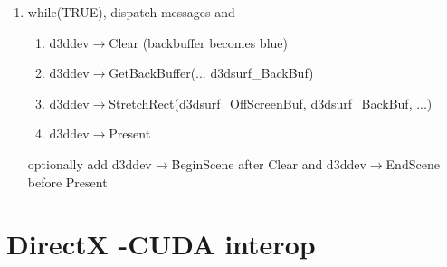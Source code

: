 \begin{frame}
\begin{enumerate}
		\item while(TRUE), dispatch messages and 
			\begin{enumerate}\tiny
				\item {\color{red}d3ddev}$\rightarrow$Clear (backbuffer becomes blue)
				\item {\color{red}d3ddev}$\rightarrow$GetBackBuffer(... {\color{red}d3dsurf\_BackBuf})
				\item {\color{red}d3ddev}$\rightarrow$StretchRect({\color{red}d3dsurf\_OffScreenBuf}, {\color{red}d3dsurf\_BackBuf}, ...)
				\item {\color{red}d3ddev}$\rightarrow$Present
			\end{enumerate}
			optionally add {\color{red}d3ddev}$\rightarrow$BeginScene after Clear and  {\color{red}d3ddev}$\rightarrow$EndScene before Present
	\end{enumerate}
\end{frame}






\section{DirectX -CUDA interop}

